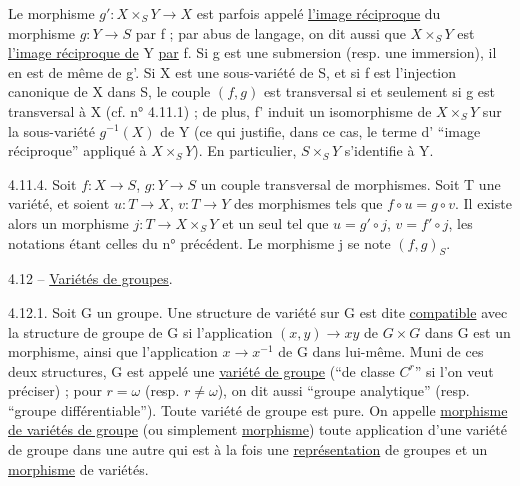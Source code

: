 Le morphisme $g':X\times_S Y\longrightarrow X$ est parfois appelé \uline{l'image réciproque} du morphisme $g:Y\longrightarrow S$ par f ; par abus de langage, on dit aussi que $X\times_S Y$ est \uline{l'image réciproque de} Y \uline{par} f. Si g est une submersion (resp. une immersion), il en est de même de g'. Si X est une sous-variété de S, et si f est l'injection canonique de X dans S, le couple $(f,g)$ est transversal si et seulement si g est transversal à X (cf. n° 4.11.1) ; de plus, f' induit un isomorphisme de $X\times_S Y$ sur la sous-variété $g^{-1}(X)$ de Y (ce qui justifie, dans ce cas, le terme d' ``image réciproque'' appliqué à $X\times_S Y$). En particulier, $S\times_S Y$ s'identifie à Y.

4.11.4. Soit $f:X\longrightarrow S$, $g:Y\longrightarrow S$ un couple transversal de morphismes. Soit T une variété, et soient $u:T\longrightarrow X$, $v:T\longrightarrow Y$ des morphismes tels que $f\circ u=g\circ v$. Il existe alors un morphisme $j:T\longrightarrow X\times_S Y$ et un seul tel que $u=g'\circ j$, $v=f'\circ j$, les notations étant celles du n° précédent. Le morphisme j se note $(f,g)_S$.

4.12 -- \uline{Variétés de groupes}.

4.12.1. Soit G un groupe. Une structure de variété sur G est dite \uline{compatible} avec la structure de groupe de G si l'application $(x,y)\longrightarrow xy$ de $G\times G$ dans G est un morphisme, ainsi que l'application $x\longrightarrow x^{-1}$ de G dans lui-même. Muni de ces deux structures, G est appelé une \uline{variété de groupe} (``de classe $C^r$'' si l'on veut préciser) ; pour $r=\omega$ (resp. $r\ne\omega$), on dit aussi ``groupe analytique'' (resp. ``groupe différentiable''). Toute variété de groupe est pure. On appelle \uline{morphisme de variétés de groupe} (ou simplement \uline{morphisme}) toute application d'une variété de groupe dans une autre qui est à la fois une \uline{représentation} de groupes et un \uline{morphisme} de variétés.

